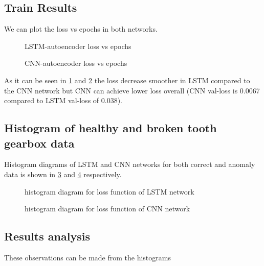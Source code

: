 \subsection*{Train Results}

We can plot the loss vs epochs in both networks. 

\begin{figure}[H]
\centering
{}
\caption{LSTM-autoencoder loss vs epochs}
\label{fig7}
\end{figure}

\begin{figure}[H]
\centering
{}
\caption{CNN-autoencoder loss vs epochs}
\label{fig8}
\end{figure}

As it can be seen in \ref{fig7} and \ref{fig8} the loss decrease smoother in LSTM compared to the CNN network but CNN can achieve lower loss overall (CNN val-loss is 0.0067 compared to LSTM val-loss of 0.038).

\subsection*{Histogram of healthy and broken tooth gearbox data}

Histogram diagrams of LSTM and CNN networks for both correct and anomaly data is shown in \ref{fig9} and \ref{fig10} respectively.

\begin{figure}[H]
\centering
{}\quad
{}
\caption{histogram diagram for loss function of LSTM network}
\label{fig9}
\end{figure}

\begin{figure}[H]
\centering
{}\quad
{}
\caption{histogram diagram for loss function of CNN network}
\label{fig10}
\end{figure}

\subsection*{Results analysis}

These observations can be made from the histograms

